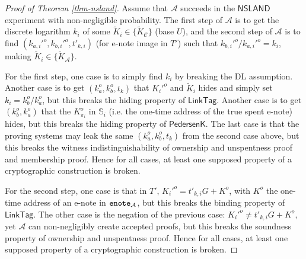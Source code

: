 \documentclass{article}
\theoremstyle{plain}
\theoremstyle{remark}
\begin{document}
\begin{proof}[Proof of Theorem \ref{thm-nsland}]
Assume that $\mathcal{A}$ succeeds in the $\textsf{NSLAND}$ experiment with non-negligible probability. The first step of $\mathcal{A}$ is to get the discrete logarithm $k_i$ of some $\tilde{K}_i \in \{\tilde{K}_{\mathcal{C}}\}$ (base $U$), and the second step of $\mathcal{A}$ is to find $(k_{a,i}'^o, k_{b,i}'^o, t'_{k,i})$ (for e-note image in $T'$) such that $k_{b,i}'^o/k_{a,i}'^o = k_i$, making $\tilde{K}_i \in \{\tilde{K}_{\mathcal{A}}\}$.

For the first step, one case is to simply find $k_i$ by breaking the DL assumption. Another case is to get $(k_a^o, k_b^o, t_k)$ that $K_i'^o$ and $\tilde{K}_i$ hides and simply set $k_i = k_b^o / k_a^o$, but this breaks the hiding property of $\textsf{LinkTag}$. Another case is to get $(k_b^o, k_a^o)$ that the $K_{\pi_i}^o$ in $\mathbb{S}_i$ (i.e. the one-time address of the true spent e-note) hides, but this breaks the hiding property of $\textsf{PedersenK}$. The last case is that the proving systems may leak the same $(k_a^o, k_b^o, t_k)$ from the second case above, but this breaks the witness indistinguishability of ownership and unspentness proof and membership proof. Hence for all cases, at least one supposed property of a cryptographic construction is broken.

For the second step, one case is that in $T'$, $K_i'^o = t'_{k,i} G+ K^o$, with $K^o$ the one-time address of an e-note in ${\tt enote}_{\mathcal{A}}$, but this breaks the binding property of $\textsf{LinkTag}$. The other case is the negation of the previous case: $K_i'^o \ne t'_{k,i} G+ K^o$, yet $\mathcal{A}$ can non-negligibly create accepted proofs, but this breaks the soundness property of ownership and unspentness proof. Hence for all cases, at least one supposed property of a cryptographic construction is broken.
\end{proof}
\end{document}
